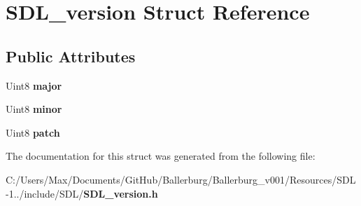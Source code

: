 \section{S\+D\+L\+\_\+version Struct Reference}
\label{struct_s_d_l__version}
\subsection*{Public Attributes}
\begin{DoxyCompactItemize}
\item 
Uint8 {\bfseries major}\label{struct_s_d_l__version_ad7d7674532073eed237b90f546c97cd0}

\item 
Uint8 {\bfseries minor}\label{struct_s_d_l__version_a6c35c7bf80245028d5970e6a504ecf57}

\item 
Uint8 {\bfseries patch}\label{struct_s_d_l__version_aa6dacff18edee8cd037c773b843be0f1}

\end{DoxyCompactItemize}


The documentation for this struct was generated from the following file\+:\begin{DoxyCompactItemize}
\item 
C\+:/\+Users/\+Max/\+Documents/\+Git\+Hub/\+Ballerburg/\+Ballerburg\+\_\+v001/\+Resources/\+S\+D\+L-\/1../include/\+S\+D\+L/{\bf S\+D\+L\+\_\+version.\+h}\end{DoxyCompactItemize}
